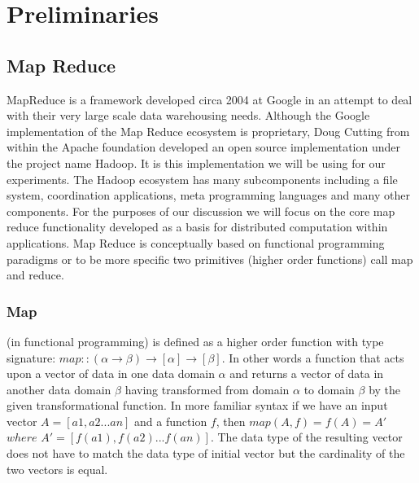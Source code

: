 \documentclass[runningheads]{llncs}
\begin{document}
\section{Preliminaries}

\subsection{Map Reduce}

MapReduce \cite{Google04} is a framework developed circa 2004 at Google in an attempt to deal with their very large scale data warehousing needs. Although the Google implementation of the Map Reduce ecosystem is proprietary, Doug Cutting from within the Apache foundation developed an open source implementation under the project name Hadoop. It is this implementation we will be using for our experiments. The Hadoop ecosystem has many subcomponents including a file system, coordination applications, meta programming languages and many other components. For the purposes of our discussion we will focus on the core map reduce functionality developed as a basis for distributed computation within applications. Map Reduce is conceptually based on functional programming paradigms or to be more specific two primitives (higher order functions) call map and reduce.

\subsubsection{Map}\label{•}  
(in functional programming) is defined as a higher order function with type signature: $map  :: (\alpha \rightarrow \beta) \rightarrow [\alpha] \rightarrow [\beta]$. In other words a function that acts upon a vector of data in one data domain $\alpha$ and returns a vector of data in another data domain $\beta$ having transformed from domain $\alpha$ to domain $\beta$ by the given transformational function. In more familiar syntax if we have an input vector $A = [ a1,a2...an ]$ and a function $f$, then $map(A,f) = f(A) = A'$ $where$ $A' = [f(a1),f(a2)...f(an)]$. The data type of the resulting vector does not have to match the data type of initial vector but the cardinality of the two vectors is equal.
\end{document}
